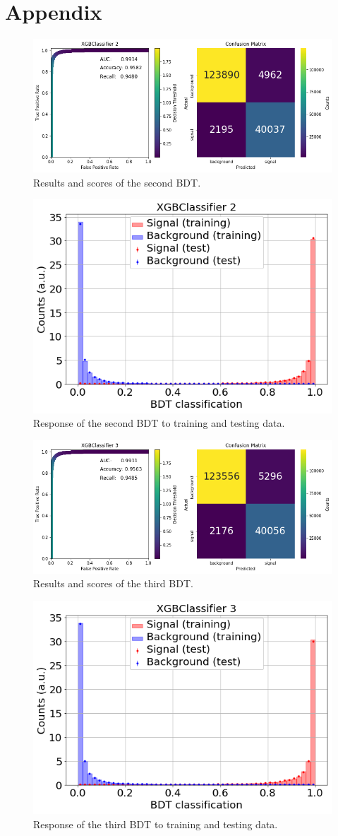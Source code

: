 \section{Appendix}
\label{sec:appendix}

\begin{figure}[H]
	\centering
	\includegraphics[width=0.8\linewidth]{plots/BDT_2.png}
	\caption{Results and scores of the second BDT.}
	\label{fig:BDT_2}
\end{figure}

\begin{figure}[H]
	\centering
	\includegraphics[width=0.5\linewidth]{plots/BDT2_pred.png}
	\caption{Response of the second BDT to training and testing data.}
	\label{fig:BDT_2_pred}
\end{figure}

\begin{figure}[H]
	\centering
	\includegraphics[width=0.8\linewidth]{plots/BDT_3.png}
	\caption{Results and scores of the third BDT.}
	\label{fig:BDT_3}
\end{figure}

\begin{figure}[H]
	\centering
	\includegraphics[width=0.5\linewidth]{plots/BDT3_pred.png}
	\caption{Response of the third BDT to training and testing data.}
	\label{fig:BDT_3_pred}
\end{figure}

